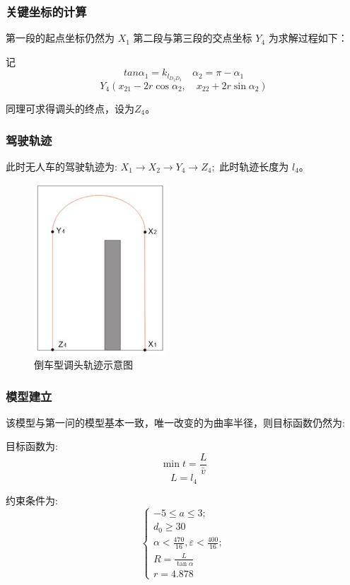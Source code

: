 \documentclass{article}
\begin{document}
\subsubsection{关键坐标的计算}
第一段的起点坐标仍然为 $X_{1}$
第二段与第三段的交点坐标 $Y_{4}$ 为求解过程如下：

记
\begin{equation*}
    tan\alpha_{1}=k_{l_{D_{2} D_{3}}} \quad \alpha_{2}=\pi-\alpha_{1}
\end{equation*}
\begin{equation*}
    Y_{4}\left(x_{21}-2 r \cos \alpha_{2}, \quad x_{22}+2 r \sin \alpha_{2}\right)
\end{equation*}

同理可求得调头的终点，设为$Z_4$。

\subsubsection{驾驶轨迹}
此时无人车的驾驶轨迹为:
$X_{1} \rightarrow X_{2} \rightarrow Y_{4} \rightarrow Z_{4} ;$ 此时轨迹长度为 $l_{4}$。
\begin{figure}[h]
    \centering
    \includegraphics[scale=0.9]{9.jpg}
    \caption{倒车型调头轨迹示意图}
\end{figure}

\subsubsection{模型建立}
该模型与第一问的模型基本一致，唯一改变的为曲率半径，则目标函数仍然为:

目标函数为:
\begin{equation}
    \min t=\frac{L}{\bar{v}}
\end{equation}
\begin{equation}
    L=l_{4}
\end{equation}

约束条件为:
\begin{equation*}
    \left\{\begin{array}{c}
        -5 \leqslant a \leqslant 3 ;                        \\
        d_{0} \geq 30                                       \\
        \alpha<\frac{470}{16}, \varepsilon<\frac{400}{16} ; \\
        R=\frac{L}{\tan \alpha}                             \\
        r=4.878
    \end{array}\right.
\end{equation*}
\end{document}
